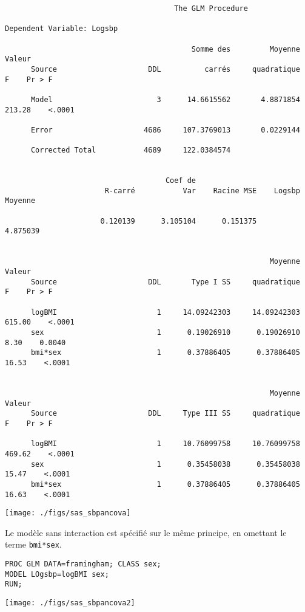 \begin{verbatim}
                                       The GLM Procedure

Dependent Variable: Logsbp

                                           Somme des         Moyenne     Valeur
      Source                     DDL          carrés     quadratique          F    Pr > F

      Model                        3      14.6615562       4.8871854     213.28    <.0001

      Error                     4686     107.3769013       0.0229144

      Corrected Total           4689     122.0384574


                                     Coef de
                       R-carré           Var    Racine MSE    Logsbp Moyenne

                      0.120139      3.105104      0.151375          4.875039


                                                             Moyenne     Valeur
      Source                     DDL       Type I SS     quadratique          F    Pr > F

      logBMI                       1     14.09242303     14.09242303     615.00    <.0001
      sex                          1    ￼ 0.19026910      0.19026910       8.30    0.0040
      bmi*sex                      1    ￼ 0.37886405      0.37886405      16.53    <.0001


                                                             Moyenne     Valeur
      Source                     DDL     Type III SS     quadratique          F    Pr > F

      logBMI                       1     10.76099758     10.76099758      469.62    <.0001
      sex                          1      0.35458038    ￼ 0.35458038       15.47    <.0001
      bmi*sex                      1      0.37886405      0.37886405       16.63    <.0001
\end{verbatim}

\texttt{[image: ./figs/sas\_sbpancova]}

Le modèle sans interaction est spécifié sur le même principe, en omettant le
terme \texttt{bmi*sex}.
\begin{verbatim}
PROC GLM DATA=framingham; CLASS sex;
MODEL LOgsbp=logBMI sex;
RUN;
\end{verbatim}


\texttt{[image: ./figs/sas\_sbpancova2]}

